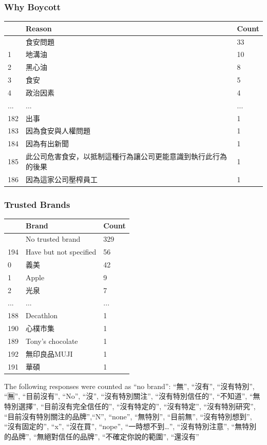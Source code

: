 \documentclass[
  letterpaper,
  DIV=11,
  numbers=noendperiod]{scrartcl}
\begin{document}
\subsubsection{Why Boycott}\label{why-boycott}

\begin{longtable}[]{@{}lll@{}}
\toprule\noalign{}
& Reason & Count \\
\midrule\noalign{}
\endhead
\bottomrule\noalign{}
\endlastfoot
0 & 食安問題 & 33 \\
1 & 地溝油 & 10 \\
2 & 黑心油 & 8 \\
3 & 食安 & 5 \\
4 & 政治因素 & 4 \\
... & ... & ... \\
182 & 出事 & 1 \\
183 & 因為食安與人權問題 & 1 \\
184 & 因為有出新聞 & 1 \\
185 & 此公司危害食安，以抵制這種行為讓公司更能意識到執行此行為的後果 &
1 \\
186 & 因為這家公司壓榨員工 & 1 \\
\end{longtable}

\subsubsection{Trusted Brands}\label{trusted-brands}

\begin{longtable}[]{@{}lll@{}}
\toprule\noalign{}
& Brand & Count \\
\midrule\noalign{}
\endhead
\bottomrule\noalign{}
\endlastfoot
193 & No trusted brand & 329 \\
194 & Have but not specified & 56 \\
0 & 義美 & 42 \\
1 & Apple & 9 \\
2 & 光泉 & 7 \\
... & ... & ... \\
188 & Decathlon & 1 \\
190 & 心樸市集 & 1 \\
189 & Tony's chocolate & 1 \\
192 & 無印良品MUJI & 1 \\
191 & 華碩 & 1 \\
\end{longtable}

The following responses were counted as ``no brand'': ``無'', ``沒有'',
``沒有特別'', ``🈚️'', ``目前沒有'', ``No'', ``沒'', ``沒有特別關注'',
``沒有特別信任的'', ``不知道'', ``無特別選擇'', ``目前沒有完全信任的'',
``沒有特定的'', ``沒有特定'', ``沒有特別研究'',
``目前沒有特別關注的品牌'',``N'', ``none'', ``無特別'', ``目前無'',
``沒有特別想到'', ``沒有固定的'', ``x'', ``沒在買'', ``nope'',
``一時想不到\ldots{}'', ``沒有特別注意'', ``無特別的品牌'',
``無絕對信任的品牌'', ``不確定你說的範圍'', ``還沒有''
\end{document}
